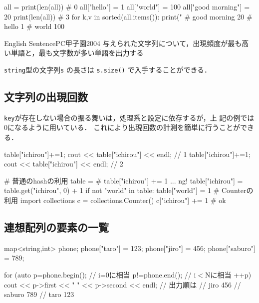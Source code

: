 \begin{pybox}
all = {}
print(len(all))                 # 0
all["hello"] = 1
all["world"] = 100
all["good morning"] = 20
print(len(all))                 # 3
for k,v in sorted(all.items()):
    print("
# good morning 20
# hello 1
# world 100
\end{pybox}

\begin{psbox}{English Sentence}{PC甲子園2004}
与えられた文字列について，出現頻度が最も高い単語と，最も文字数が多い単語を出力する

\end{psbox}


\texttt{string}型の文字列\texttt{s} の長さは \texttt{s.size()} で入手することができる．

\subsection{文字列の出現回数}

\texttt{key}が存在しない場合の振る舞いは，処理系と設定に依存するが，上
記の例では0になるように用いている．
これにより出現回数の計測を簡単に行うことができる．

\begin{cbox}
  table["ichirou"]+=1;
  cout << table["ichirou"] << endl; // 1
  table["ichirou"]+=1;
  cout << table["ichirou"] << endl; // 2
\end{cbox}

\begin{pybox}
# 普通のhashの利用
table = {}  
# table["ichirou"] += 1 ... ng!
table["ichirou"] = table.get("ichirou", 0) + 1
if not "world" in table:
   table["world"] = 1
# Counterの利用
import collections
c = collections.Counter()
c["ichirou"] += 1 # ok
\end{pybox}

\subsection{連想配列の要素の一覧}

\begin{c11box}[emph={map,iterator,begin,end,first,second}]
  map<string,int> phone;
  phone["taro"] = 123;
  phone["jiro"] = 456;
  phone["saburo"] = 789;

  for (auto p=phone.begin(); // i=0に相当
       p!=phone.end(); // i$<$Nに相当
       ++p) {
      cout << p->first << " " << p->second << endl;
  }
// 出力順は
// jiro 456
// saburo 789
// taro 123
\end{c11box}


